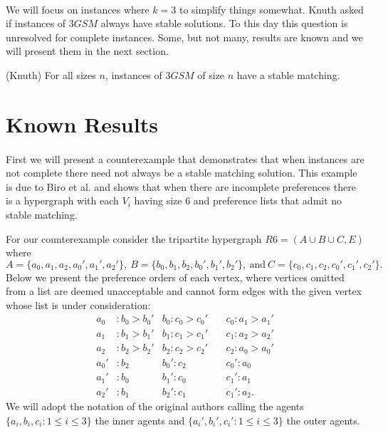\paragraph{}
We will focus on instances where $k=3$ to simplify things somewhat. Knuth asked if instances of $3GSM$ always have stable solutions. To this day this question is unresolved for complete instances. Some, but not many, results are known and we will present them in the next section.
\begin{conjecture}\label{conj:unstab}
(Knuth) For all sizes $n$, instances of $3GSM$ of size $n$ have a stable matching.
\end{conjecture} 
\section{Known Results}
\paragraph{}
First we will present a counterexample that demonstrates that when instances are not complete there need not always be a stable matching solution. This example is due to Biro et al. \cite{biro2010three} and shows that when there are incomplete preferences there is a hypergraph with each $V_i$ having size $6$ and preference lists that admit no stable matching.
\begin{note}\label{ex:R6}
For our counterexample consider the tripartite hypergraph $R6 = (A \cup B \cup C, E)$ where $$A = \{a_0, a_1,a_2,a_0', a_1',a_2'\},\ B = \{b_0, b_1,b_2,b_0',b_1',b_2'\},\ \text{and}\ C = \{c_0,c_1,c_2,c_0',c_1',c_2'\}.$$ Below we present the preference orders of each vertex, where vertices omitted from a list are deemed unacceptable and cannot form edges with the given vertex whose list is under consideration:
\begin{align*}
a_0 &: b_0 > b_0' &b_0: c_0 > c_0' &\ &c_0:a_1 > a_1'\\
a_1 &: b_1 > b_1' &b_1: c_1 > c_1' &\ &c_1:a_2 > a_2'\\
a_2 &: b_2 > b_2' &b_2: c_2 > c_2' &\ &c_2: a_0> a_0'\\
a_0' &: b_2 &b_0': c_2 &\ &c_0':a_0 \\
a_1'&: b_0 &b_1': c_0 &\ &c_1':a_1\\
a_2' &:b_1 &b_2': c_1 &\ & c_1':a_2.
\end{align*}
We will adopt the notation of the original authors calling the agents $\{a_i, b_i, c_i: 1 \leq i \leq 3 \}$ the inner agents and $\{a_i',b_i',c_i': 1\leq i \leq 3\}$ the outer agents.
\end{note}
